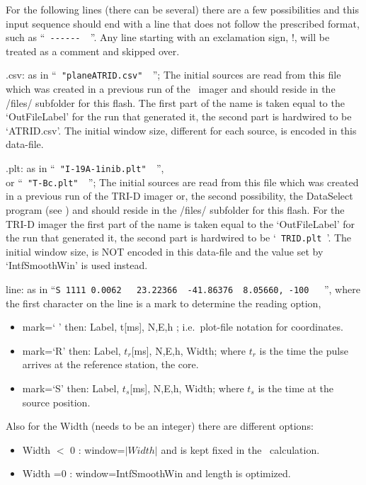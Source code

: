 For the following lines (there can be several) there are a few possibilities and this input sequence should end with a line that does not follow the prescribed format, such as ``\verb# ------  #''.  Any line starting with an exclamation sign, !, will be treated as a comment and skipped over.
\begin{enumerate*}
\item[.csv:]  as in ``\verb# "planeATRID.csv"  #''; The initial sources are read from this file which was created in a previous run of the \ATRID\ imager and should reside in the /files/ subfolder for this flash. The first part of the name is taken equal to the `OutFileLabel' for the run that generated it, the second part is hardwired to be `ATRID.csv'. The initial window size, different for each source, is encoded in this data-file.
\item[.plt:] as in ``\verb# "I-19A-1inib.plt"  #'', \\or ``\verb# "T-Bc.plt"  #''; The initial sources are read from this file which was created in a previous run of the TRI-D imager or, the second possibility, the DataSelect program (see )  and should reside in the /files/ subfolder for this flash. For the TRI-D imager the first part of the name is taken equal to the `OutFileLabel' for the run that generated it, the second part is hardwired to be `\verb# TRID.plt #'. The initial window size, is NOT encoded in this data-file and the value set by `IntfSmoothWin' is used instead.
\item[line:] as in ``\verb#S 1111 0.0062   23.22366  -41.86376  8.05660, -100   #'', where the first character on the line is a mark to determine the reading option,
    \begin{itemize}
      \item mark=` ' then: Label, t[ms], N,E,h ; i.e.\  plot-file notation for  coordinates.
      \item  mark=`R' then: Label, $t_r$[ms], N,E,h, Width; where $t_r$ is the time the pulse arrives at the reference station, the core.
      \item  mark=`S' then: Label, $t_s$[ms], N,E,h, Width; where $t_s$ is the time at the source position.
   \end{itemize}
   Also for the Width (needs to be an integer) there are different options:
   \begin{itemize}
      \item Width $<$ 0 : window=$|Width|$ and is kept fixed in the \ATRID\ calculation.
      \item Width =0 : window=IntfSmoothWin and length is optimized.

\end{itemize}
\end{enumerate*}
